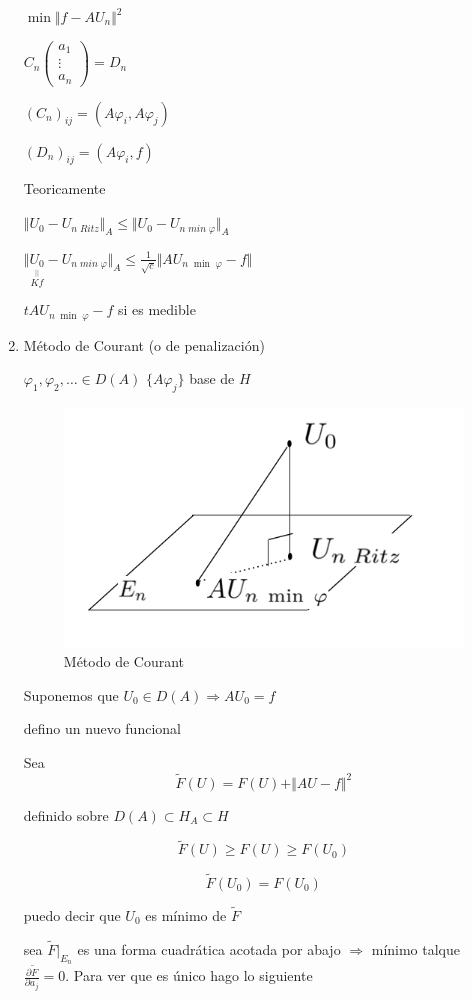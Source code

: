 \documentclass[a4paper,10pt]{book}
\begin{document}
\begin{enumerate}
$\min \Vert f- A U_n \Vert^2$

$C_n \left( 
\begin{array}{c}
     a_1  \\
     \vdots\\
     a_n
\end{array}
\right)= D_n$

$(C_n)_{ij}= (A\varphi_i,A\varphi_j)$ 

$(D_n)_{ij}= (A\varphi_i,f)$

Teoricamente

$\Vert U_0-U_{n\;Ritz}\Vert_A \leq \Vert U_0 - U_{n\;min\;\varphi} \Vert_A $

$\Vert \underset{ \overset{||}{Kf} }{U_0}  -U_{n\;min\;\varphi}\Vert_A \leq \frac{1}{\sqrt{c}} \Vert A U_{n\;\min\;\varphi } -f\Vert$

$t A U_{n\;\min\;\varphi } -f$ si es medible

\item Método de Courant (o de penalización) 

$\varphi_{1},\varphi_{2},\ldots\in D(A)$  $\{A\varphi_j \}$ base de $H$

\begin{figure}[H]
    \centering
    \includegraphics[width=0.5\linewidth]{Screen Shot 2024-03-26 at 19.35.32.png}
    \caption{Método de Courant}
    \label{fig:10}
\end{figure}

Suponemos que $U_0\in D(A) \Rightarrow AU_0 = f$ 

defino un nuevo funcional 

Sea
\[
\tilde{F}(U)= F(U) + \Vert AU -f \Vert^2  
\]


definido sobre $D(A) \subset H_A \subset H$

\[
\tilde{F}(U) \geq F(U) \geq F(U_0)
\]

\[
\tilde{F}(U_0) = F(U_0)
\]

puedo decir que $U_0$ es mínimo de $\tilde{F}$ 

sea $\tilde{F}|_{E_n}$ es una forma cuadrática acotada por abajo $\Rightarrow$ mínimo talque 
$\frac{\partial \tilde{F}}{\partial a_j} =0$. Para ver que es único hago lo siguiente


\end{enumerate}
\end{document}
